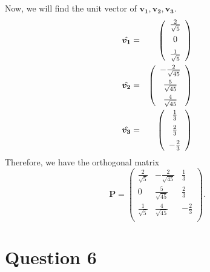 \documentclass{article}
\newcommand{\bs}[1]{\boldsymbol{#1}}
\begin{document}
Now, we will find the unit vector of $\bs{v_1,v_2,v_3}$. 
\begin{eqnarray}
    \hat{\bs{v_1}} &=& \left(\begin{array}{c}
      \frac{2}{\sqrt{5}} \\[0.2cm]
      0 \\[0.2cm]
      \frac{1}{\sqrt{5}} \\
    \end{array}\right) \notag\\
    \hat{\bs{v_2}} &=& \left(\begin{array}{c}
      -\frac{2}{\sqrt{45}} \\[0.2cm]
      \frac{5}{\sqrt{45}} \\[0.2cm]
      \frac{4}{\sqrt{45}} \\
    \end{array}\right) \notag\\
    \hat{\bs{v_3}} &=& \left(\begin{array}{c}
      \frac{1}{3} \\[0.2cm]
      \frac{2}{3} \\[0.2cm]
      -\frac{2}{3} \\
    \end{array}\right)
\end{eqnarray}
Therefore, we have the orthogonal matrix $$\bs{P} = \left(\begin{array}{ccc}
      \frac{2}{\sqrt{5}} & -\frac{2}{\sqrt{45}} & \frac{1}{3} \\[0.2cm]
      0 &  \frac{5}{\sqrt{45}} & \frac{2}{3}\\[0.2cm]
      \frac{1}{\sqrt{5}} &  \frac{4}{\sqrt{45}} & -\frac{2}{3} \\
    \end{array}\right).$$

\vfill

\newpage

\section*{Question 6}
\end{document}
